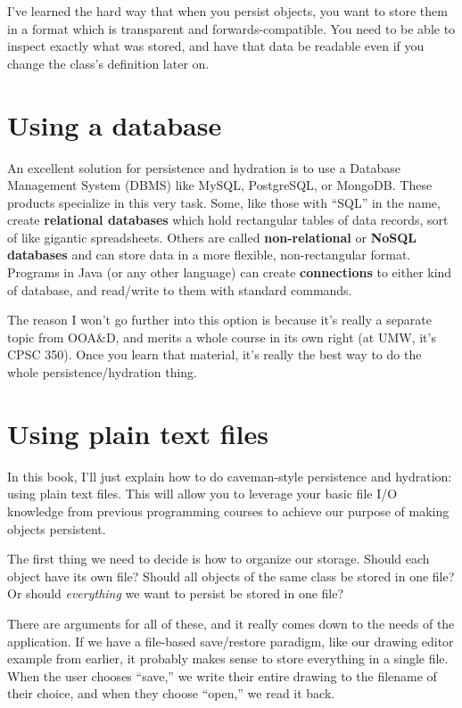 I've learned the hard way that when you persist objects, you want to store
them in a format which is transparent and forwards-compatible. You need to be
able to inspect exactly what was stored, and have that data be readable even
if you change the class's definition later on.

\section{Using a database}

An excellent solution for persistence and hydration is to use a Database
Management System (DBMS) like MySQL, PostgreSQL, or MongoDB. These products
specialize in this very task. Some, like those with ``SQL'' in the name,
create \textbf{relational databases} which hold rectangular tables of data
records, sort of like gigantic spreadsheets. Others are called
\textbf{non-relational} or \textbf{NoSQL databases} and can store data in a
more flexible, non-rectangular format. Programs in Java (or any other
language) can create \textbf{connections} to either kind of database, and
read/write to them with standard commands.

The reason I won't go further into this option is because it's really a
separate topic from OOA\&D, and merits a whole course in its own right (at
UMW, it's CPSC 350). Once you learn that material, it's really the best way to
do the whole persistence/hydration thing.

\section{Using plain text files}

In this book, I'll just explain how to do caveman-style persistence and
hydration: using plain text files. This will allow you to leverage your basic
file I/O knowledge from previous programming courses to achieve our purpose of
making objects persistent.

The first thing we need to decide is how to organize our storage. Should each
object have its own file? Should all objects of the same class be stored in
one file? Or should \textit{everything} we want to persist be stored in one
file?

There are arguments for all of these, and it really comes down to the needs of
the application. If we have a file-based save/restore paradigm, like our
drawing editor example from earlier, it probably makes sense to store
everything in a single file. When the user chooses ``save,'' we write their
entire drawing to the filename of their choice, and when they choose ``open,''
we read it back.

